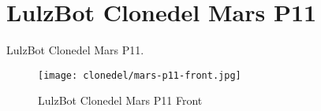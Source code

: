 %
%
%
%
%

\section{LulzBot Clonedel Mars P11}
LulzBot Clonedel Mars P11.

\begin{figure}[h!]
\texttt{[image: clonedel/mars-p11-front.jpg]}
 \caption{LulzBot Clonedel Mars P11 Front}
 \label{fig:clonedel-mars-p11-front}
\end{figure}


